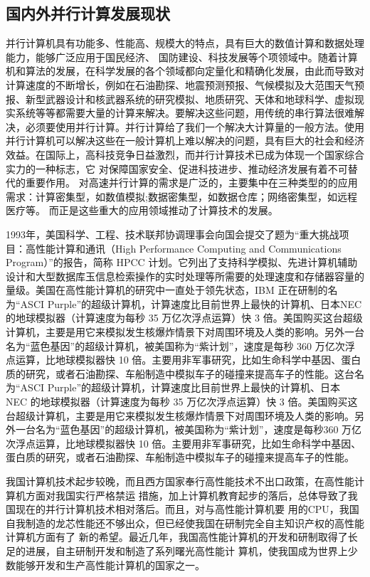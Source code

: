 \subsection{国内外并行计算发展现状}
并行计算机具有功能多、性能高、规模大的特点，具有巨大的数值计算和数据处理能力，能够广泛应用于国民经济、
国防建设、科技发展等个项领域中。随着计算机和算法的发展，在科学发展的各个领域都向定量化和精确化发展，由此而导致对计算速度的不断增长，例如在石油勘探、地震预测预报、气候模拟及大范围天气预报、新型武器设计和核武器系统的研究模拟、地质研究、天体和地球科学、虚拟现实系统等等都需要大量的计算来解决。要解决这些问题，用传统的串行算法很难解决，必须要使用并行计算。并行计算给了我们一个解决大计算量的一般方法。使用并行计算机可以解决这些在一般计算机上难以解决的问题，具有巨大的社会和经济效益。在国际上，高科技竞争日益激烈，而并行计算技术已成为体现一个国家综合实力的一种标志，它
对保障国家安全、促进科技进步、推动经济发展有着不可替代的重要作用。 对高速并行计算的需求是广泛的，主要集中在三种类型的的应用需求：计算密集型，如数值模拟;数据密集型，如数据仓库；网络密集型，如远程医疗等。
而正是这些重大的应用领域推动了计算技术的发展。

1993年，美国科学、工程、技术联邦协调理事会向国会提交了题为“重大挑战项目：高性能计算和通讯（High Performance Computing and Communications Program）”的报告，简称 HPCC 计划。它列出了支持科学模拟、先进计算机辅助设计和大型数据库玉信息检索操作的实时处理等所需要的处理速度和存储器容量的量级。美国在高性能计算机的研究中一直处于领先状态，IBM 正在研制的名为“ASCI Purple”的超级计算机，计算速度比目前世界上最快的计算机、日本NEC 的地球模拟器（计算速度为每秒 35 万亿次浮点运算）快 3 倍。美国购买这台超级计算机，主要是用它来模拟发生核爆炸情景下对周围环境及人类的影响。另外一台名为“蓝色基因”的超级计算机，被美国称为“紫计划”，速度是每秒 360 万亿次浮点运算，比地球模拟器快 10 倍。主要用非军事研究，比如生命科学中基因、蛋白质的研究，或者石油勘探、车船制造中模拟车子的碰撞来提高车子的性能。这台名为“ASCI Purple”的超级计算机，计算速度比目前世界上最快的计算机、日本 NEC 的地球模拟器（计算速度为每秒 35 万亿次浮点运算）快 3 倍。美国购买这台超级计算机，主要是用它来模拟发生核爆炸情景下对周围环境及人类的影响。另外一台名为“蓝色基因”的超级计算机，被美国称为“紫计划”，速度是每秒360 万亿次浮点运算，比地球模拟器快 10 倍。主要用非军事研究，比如生命科学中基因、蛋白质的研究，或者石油勘探、车船制造中模拟车子的碰撞来提高车子的性能。

我国计算机技术起步较晚，而且西方国家奉行高性能技术不出口政策，在高性能计算机方面对我国实行严格禁运
措施，加上计算机教育起步的落后，总体导致了我国现在的并行计算机技术相对落后。而且，对与高性能计算机要
用的CPU，我国自我制造的龙芯性能还不够出众，但已经使我国在研制完全自主知识产权的高性能计算机方面有了
新的希望。最近几年，我国高性能计算机的开发和研制取得了长足的进展，自主研制开发和制造了系列曙光高性能计
算机，使我国成为世界上少数能够开发和生产高性能计算机的国家之一。

